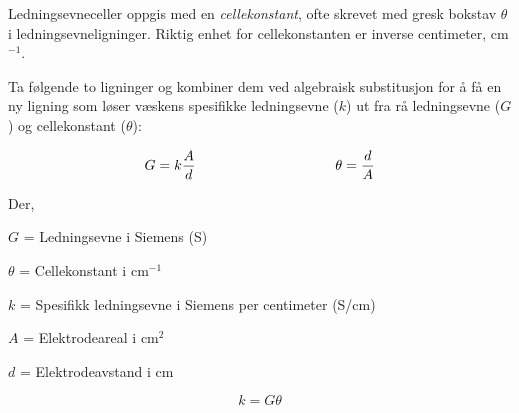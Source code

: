 

Ledningsevneceller oppgis med en {\it cellekonstant}, ofte skrevet med gresk bokstav $\theta$ i ledningsevneligninger. Riktig enhet for cellekonstanten er inverse centimeter, cm$^{-1}$.

Ta følgende to ligninger og kombiner dem ved algebraisk substitusjon for å få en ny ligning som løser væskens spesifikke ledningsevne ($k$) ut fra rå ledningsevne ($G$) og cellekonstant ($\theta$):

$$G = k{A \over d} \hbox{\hskip 100pt} \theta = {d \over A}$$

\noindent
Der,

$G$ = Ledningsevne i Siemens (S)

$\theta$ = Cellekonstant i cm$^{-1}$

$k$ = Spesifikk ledningsevne i Siemens per centimeter (S/cm)

$A$ = Elektrodeareal i cm$^{2}$

$d$ = Elektrodeavstand i cm

\vskip 10pt







$$k = G \theta$$










